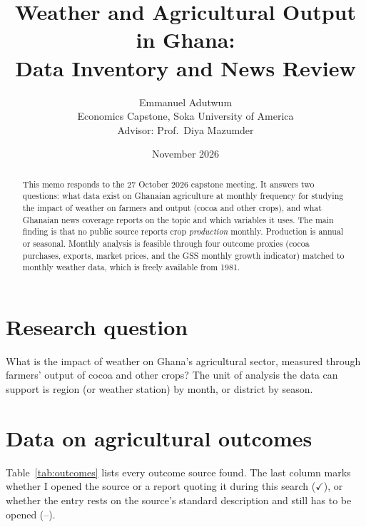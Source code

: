 \documentclass[11pt,letterpaper]{article}
\title{\vspace{-1.5em}Weather and Agricultural Output in Ghana:\\Data Inventory and News Review}
\author{Emmanuel Adutwum\\ \small Economics Capstone, Soka University of America\\ \small Advisor: Prof.\ Diya Mazumder}
\date{November 2026}
\newcommand{\ok}{$\checkmark$}
\newcommand{\no}{--}
\begin{document}
\maketitle

\begin{abstract}
\noindent This memo responds to the 27 October 2026 capstone meeting. It answers two questions: what data exist on Ghanaian agriculture at monthly frequency for studying the impact of weather on farmers and output (cocoa and other crops), and what Ghanaian news coverage reports on the topic and which variables it uses. The main finding is that no public source reports crop \emph{production} monthly. Production is annual or seasonal. Monthly analysis is feasible through four outcome proxies (cocoa purchases, exports, market prices, and the GSS monthly growth indicator) matched to monthly weather data, which is freely available from 1981.
\end{abstract}

\section{Research question}
What is the impact of weather on Ghana's agricultural sector, measured through farmers' output of cocoa and other crops? The unit of analysis the data can support is region (or weather station) by month, or district by season.

\section{Data on agricultural outcomes}

Table~\ref{tab:outcomes} lists every outcome source found. The last column marks whether I opened the source or a report quoting it during this search (\ok), or whether the entry rests on the source's standard description and still has to be opened (\no).
\end{document}

